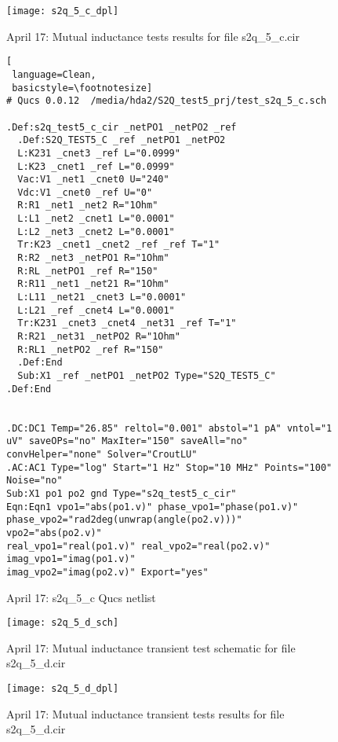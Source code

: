 \begin{figure}
  \centering
  \texttt{[image: s2q\_5\_c\_dpl]} 
  \caption{April 17: Mutual inductance tests results for file s2q\_5\_c.cir}
  \label{fig:s2q_5_c_dpl}
\end{figure} 

\begin{figure}
\begin{lstlisting}[
 language=Clean, 
 basicstyle=\footnotesize]
# Qucs 0.0.12  /media/hda2/S2Q_test5_prj/test_s2q_5_c.sch

.Def:s2q_test5_c_cir _netPO1 _netPO2 _ref
  .Def:S2Q_TEST5_C _ref _netPO1 _netPO2
  L:K231 _cnet3 _ref L="0.0999"
  L:K23 _cnet1 _ref L="0.0999"
  Vac:V1 _net1 _cnet0 U="240"
  Vdc:V1 _cnet0 _ref U="0"
  R:R1 _net1 _net2 R="1Ohm"
  L:L1 _net2 _cnet1 L="0.0001"
  L:L2 _net3 _cnet2 L="0.0001"
  Tr:K23 _cnet1 _cnet2 _ref _ref T="1"
  R:R2 _net3 _netPO1 R="1Ohm"
  R:RL _netPO1 _ref R="150"
  R:R11 _net1 _net21 R="1Ohm"
  L:L11 _net21 _cnet3 L="0.0001"
  L:L21 _ref _cnet4 L="0.0001"
  Tr:K231 _cnet3 _cnet4 _net31 _ref T="1"
  R:R21 _net31 _netPO2 R="1Ohm"
  R:RL1 _netPO2 _ref R="150"
  .Def:End
  Sub:X1 _ref _netPO1 _netPO2 Type="S2Q_TEST5_C"
.Def:End


.DC:DC1 Temp="26.85" reltol="0.001" abstol="1 pA" vntol="1 
uV" saveOPs="no" MaxIter="150" saveAll="no" convHelper="none" Solver="CroutLU"
.AC:AC1 Type="log" Start="1 Hz" Stop="10 MHz" Points="100" Noise="no"
Sub:X1 po1 po2 gnd Type="s2q_test5_c_cir"
Eqn:Eqn1 vpo1="abs(po1.v)" phase_vpo1="phase(po1.v)" 
phase_vpo2="rad2deg(unwrap(angle(po2.v)))" vpo2="abs(po2.v)" 
real_vpo1="real(po1.v)" real_vpo2="real(po2.v)" imag_vpo1="imag(po1.v)" 
imag_vpo2="imag(po2.v)" Export="yes"

\end{lstlisting}
 \caption{April 17: s2q\_5\_c Qucs netlist}
  \label{fig:s2q_5_c_qucs}
\end{figure} 

\begin{figure}
  \centering
  \texttt{[image: s2q\_5\_d\_sch]} 
  \caption{April 17: Mutual inductance transient test schematic for file s2q\_5\_d.cir}
  \label{fig:s2q_5_d_sch}
\end{figure} 

\begin{figure}
  \centering
  \texttt{[image: s2q\_5\_d\_dpl]} 
  \caption{April 17: Mutual inductance transient tests results for file s2q\_5\_d.cir}
  \label{fig:s2q_5_d_dpl}
\end{figure} 

